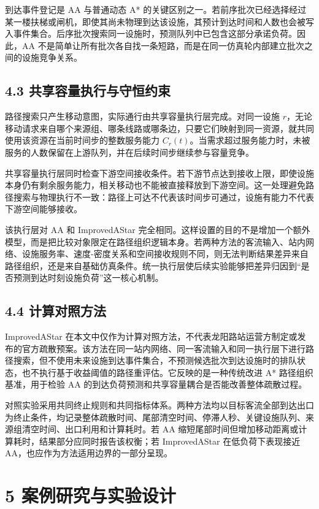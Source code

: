 \documentclass[UTF8,a4paper,12pt]{ctexart}
\begin{document}
到达事件登记是 AA 与普通动态 A* 的关键区别之一。若前序批次已经选择经过某一楼扶梯或闸机，即使其尚未物理到达该设施，其预计到达时间和人数也会被写入事件集合。后序批次搜索同一设施时，预测队列中已包含这部分承诺负荷。因此，AA 不是简单让所有批次各自找一条短路，而是在同一仿真轮内部建立批次之间的设施竞争关系。

\subsection{4.3 共享容量执行与守恒约束}

路径搜索只产生移动意图，实际通行由共享容量执行层完成。对同一设施 \(r\)，无论移动请求来自哪个来源组、哪条线路或哪条边，只要它们映射到同一资源，就共同使用该资源在当前时间步的整数服务能力 \(C_r(t)\)。当需求超过服务能力时，未被服务的人数保留在上游队列，并在后续时间步继续参与容量竞争。

共享容量执行层同时检查下游空间接收条件。若下游节点达到接收上限，即使设施本身仍有剩余服务能力，相关移动也不能被直接释放到下游空间。这一处理避免路径搜索与物理执行不一致：路径上可达不代表该时间步可通过，设施有能力不代表下游空间能够接收。

该执行层对 AA 和 ImprovedAStar 完全相同。这样设置的目的不是增加一个额外模型，而是把比较对象限定在路径组织逻辑本身。若两种方法的客流输入、站内网络、设施服务率、速度-密度关系和空间接收规则不同，则无法判断结果差异来自路径组织，还是来自基础仿真条件。统一执行层使后续实验能够把差异归因到“是否预测到达时刻设施负荷”这一核心机制。

\subsection{4.4 计算对照方法}

ImprovedAStar 在本文中仅作为计算对照方法，不代表龙阳路站运营方制定或发布的官方疏散预案。该方法在同一站内网络、同一客流输入和同一执行层下进行路径搜索，但不使用未来设施到达事件集合，不预测候选批次到达设施时的排队状态，也不执行基于收益阈值的路径重评估。它反映的是一种传统改进 A* 路径组织基准，用于检验 AA 的到达负荷预测和共享容量耦合是否能改善整体疏散过程。

对照实验采用共同终止规则和共同指标体系。两种方法均以目标客流全部到达出口为终止条件，均记录整体疏散时间、尾部清空时间、停滞人秒、关键设施队列、来源组清空时间、出口利用和计算耗时。若 AA 缩短尾部时间但增加移动距离或计算耗时，结果部分应同时报告该权衡；若 ImprovedAStar 在低负荷下表现接近 AA，也应作为方法适用边界的一部分呈现。

\section{5 案例研究与实验设计}
\end{document}
